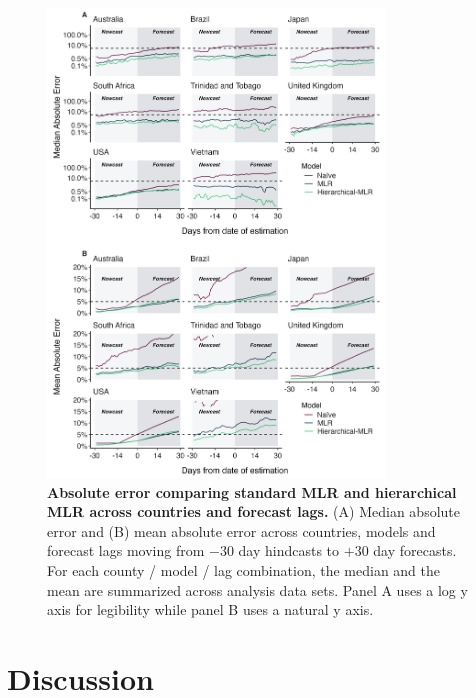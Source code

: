 \begin{figure}[h!]
	\centering
	\includegraphics[width=0.8\textwidth]{figures/model_comp_PooledMLR.png}
	\caption[\textbf{Absolute error comparing standard MLR and hierarchical MLR across countries and forecast lags.}]{
	\textbf{Absolute error comparing standard MLR and hierarchical MLR across countries and forecast lags.}
	(A) Median absolute error and (B) mean absolute error across countries, models and forecast lags moving from $-30$ day hindcasts to $+30$ day forecasts.
	For each county / model / lag combination, the median and the mean are summarized across analysis data sets.
	Panel A uses a log y axis for legibility while panel B uses a natural y axis.
	}
	\label{fig:Fig7}
\end{figure}

\section{Discussion}


